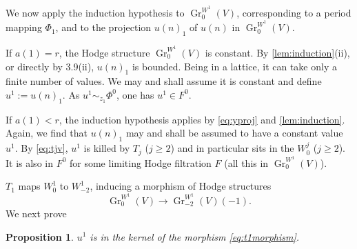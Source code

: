 \documentclass[11pt,a4paper]{article}
\theoremstyle{plain}
\newtheorem{proposition}[theorem]{Proposition}
\theoremstyle{definition}
\DeclareMathOperator{\Gr}{Gr}
\begin{document}
\subsection{}
We now apply the induction hypothesis to $\Gr_0^{W^1}(V)$, corresponding to a period mapping $\Phi_1$, and to the projection $u(n)_1$ of $u(n)$ in $\Gr_0^{W^1}(V)$.

If $a(1)=r$, the Hodge structure $\Gr_0^{W^1}(V)$ is constant. By \ref{lem:induction}(ii), or directly by 3.9(ii), $u(n)_1$ is bounded. Being in a lattice, it can take only a finite number of values. We may and shall assume it is constant and define $u^1:=u(n)_1$. As $u^1\sim_{z_1}\Phi^0$, one has $u^1\in F^0$.

If $a(1)<r$, the induction hypothesis applies by \eqref{eq:yproj} and \ref{lem:induction}. Again, we find that $u(n)_1$ may and shall be assumed to have a constant value $u^1$. By \eqref{eq:tjv}, $u^1$ is killed by $T_j$ ($j\geq 2$) and in particular sits in the $W^j_0$ ($j\geq 2$). It is also in $F^0$ for some limiting Hodge filtration $F$ (all this in $\Gr_0^{W^1}(V)$).

$T_1$ maps $W^1_0$ to $W^1_{-2}$, inducing a morphism of Hodge structures
\begin{equation}\label{eq:t1morphism}
\Gr_0^{W^1}(V)\to\Gr_{-2}^{W^1}(V)(-1).
\end{equation}
We next prove

\begin{proposition}\label{prop:kernel}
$u^1$ is in the kernel of the morphism \eqref{eq:t1morphism}.
\end{proposition}
\end{document}
